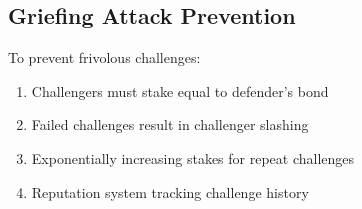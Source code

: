 \subsection{Griefing Attack Prevention}

To prevent frivolous challenges:

\begin{enumerate}
    \item Challengers must stake equal to defender's bond
    \item Failed challenges result in challenger slashing
    \item Exponentially increasing stakes for repeat challenges
    \item Reputation system tracking challenge history
\end{enumerate}

